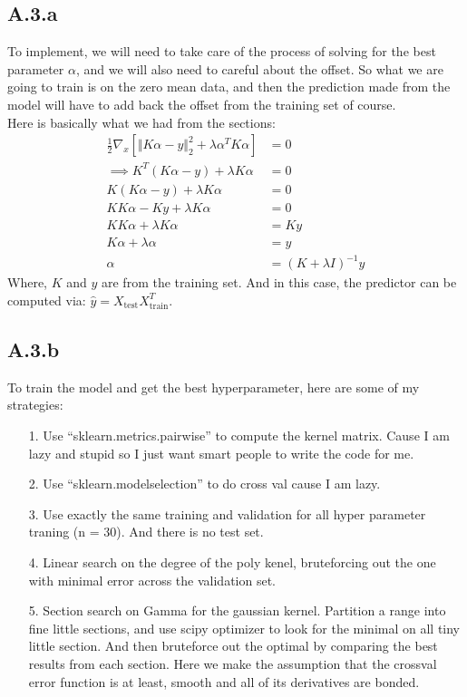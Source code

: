 \documentclass[]{article}
\begin{document}
    \subsection*{A.3.a}
        To implement, we will need to take care of the process of solving for the best parameter $\alpha$, and we will also need to careful about the offset. So what we are going to train is on the zero mean data, and then the prediction made from the model will have to add back the offset from the training set of course. 
        \\
        Here is basically what we had from the sections: 
        \begin{align*}\tag{A.3.a}\label{eqn:A.3.a}
            \frac{1}{2}\nabla_x[\Vert K\alpha - y\Vert_2^2 + \lambda \alpha^T K \alpha] &= 0
            \\
            \implies K^T(K\alpha - y) + \lambda K\alpha &= 0
            \\
            K(K\alpha - y) + \lambda K\alpha &= 0
            \\
            KK\alpha - Ky + \lambda K\alpha &= 0
            \\
            KK\alpha + \lambda K\alpha &= Ky
            \\
            K \alpha + \lambda \alpha &= y
            \\
            \alpha &= (K + \lambda I)^{-1}y
        \end{align*}
        Where, $K$ and $y$ are from the training set. And in this case, the predictor can be computed via: $\hat{y} = X_\text{test}X^T_{\text{train}}$.
    \subsection*{A.3.b}
        To train the model and get the best hyperparameter, here are some of my strategies: 
        \begin{enumerate}
            \item[1.] Use ``sklearn.metrics.pairwise'' to compute the kernel matrix. Cause I am lazy and stupid so I just want smart people to write the code for me. 
            \item[2.] Use ``sklearn.modelselection'' to do cross val cause I am lazy. 
            \item[3.] Use exactly the same training and validation for all hyper parameter traning (n = 30). And there is no test set. 
            \item[4.] Linear search on the degree of the poly kenel, bruteforcing out the one with minimal error across the validation set. 
            \item[5.] Section search on Gamma for the gaussian kernel. Partition a range into fine little sections, and use scipy optimizer to look for the minimal on all tiny little section. And then bruteforce out the optimal by comparing the best results from each section. Here we make the assumption that the crossval error function is at least, smooth and all of its derivatives are bonded. 
        \end{enumerate}
\end{document}
